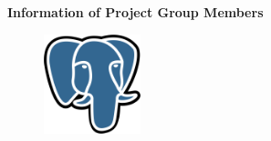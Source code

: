 \documentclass[11pt,fleqn]{book} %
\begin{document}
\vspace*{4cm}
\textbf{Information of Project Group Members}\\ %
\vspace*{4cm}
\endgroup
{}

\newpage
\begin{figure}[h] %
    \hspace{100mm}
    \includegraphics[width=0.25\textwidth]{Pictures/pgsql.png}
\end{figure}
\end{document}
